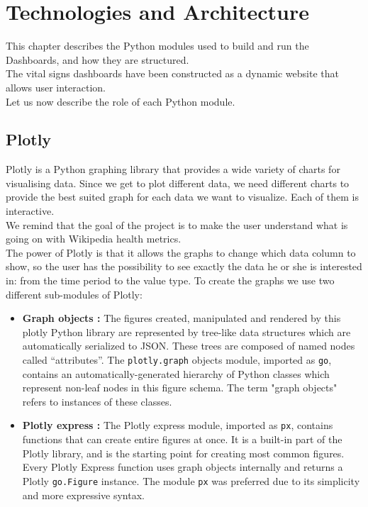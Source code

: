\chapter{Technologies and Architecture}
\label{cha:456}
This chapter describes the Python modules used to build and run the Dashboards, and how they are structured.\\
The vital signs dashboards have been constructed as a dynamic website that allows user interaction.\\
Let us now describe the role of each Python module.

\section{Plotly}
\label{sec:plotly}
Plotly is a Python graphing library that provides a wide variety of charts for visualising data.
Since we get to plot different data, we need different charts to provide the best suited graph for each data we want to visualize. Each of them is interactive. \\
We remind that the goal of the project is to make the user understand what is going on with Wikipedia health metrics.\\
The power of Plotly is that it allows the graphs to change which data column to show, so the user has the possibility to see exactly the data he or she is interested in: from the time period to the value type.
To create the graphs we use two different sub-modules of Plotly:
\begin{itemize}
    \item \textbf{Graph objects \cite{go}:} The figures created, manipulated and rendered by this plotly Python library are represented by tree-like data structures which are automatically serialized to JSON. These trees are composed of named nodes called ``attributes''. The \verb#plotly.graph# objects module, imported as \verb#go#, contains an automatically-generated hierarchy of Python classes which represent non-leaf nodes in this figure schema. The term "graph objects" refers to instances of these classes.
    \item \textbf{Plotly express \cite{px}:} The Plotly express module, imported as \verb#px#, contains functions that can create entire figures at once. It is a built-in part of the Plotly library, and is the starting point for creating most common figures. Every Plotly Express function uses graph objects internally and returns a Plotly \verb#go.Figure# instance.
    The module \verb#px# was preferred due to its simplicity and more expressive syntax. 
\end{itemize}
